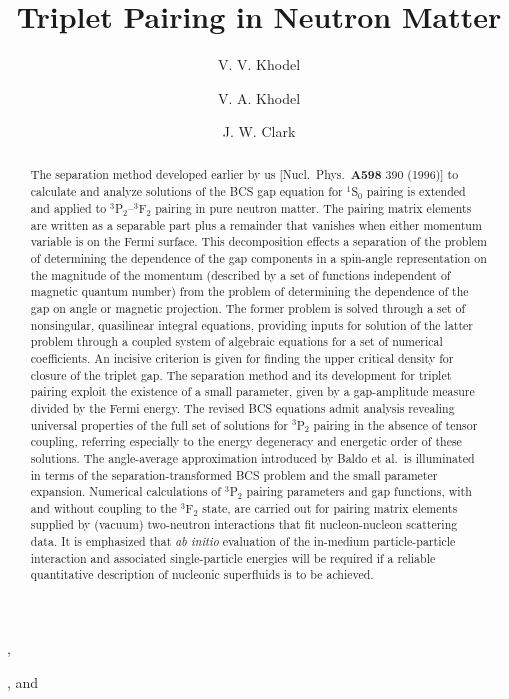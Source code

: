 
\newcommand{\diff}{{\rm d}}

\begin{frontmatter}
\title{Triplet Pairing in Neutron Matter}

\author{V. V. Khodel},
\author{V. A. Khodel}, and
\author{J. W. Clark}
\address{McDonnell Center for the Space Sciences
and Department of Physics, \\
Washington University, St. Louis, MO 63130-4899}

\begin{abstract}
The separation method developed earlier by us [Nucl.\ Phys.\ {\bf A598} 390 
(1996)] to calculate and analyze solutions of the BCS gap equation for 
$^1$S$_0$ pairing is extended and applied to $^3$P$_2$--$^3$F$_2$ pairing in
pure neutron matter.  The pairing matrix elements are written as a separable 
part plus a remainder that vanishes when either momentum variable is on the 
Fermi surface.  This decomposition effects a separation of the problem 
of determining the dependence of the gap components in a spin-angle 
representation on the magnitude of the momentum (described by a set of
functions independent of magnetic quantum number) from the problem of 
determining the dependence of the gap on angle or magnetic projection.  
The former problem is solved through a set of nonsingular, quasilinear 
integral equations, providing inputs for solution of the latter problem 
through a coupled system of algebraic equations for a set of numerical 
coefficients.  An incisive criterion is given for finding the upper 
critical density for closure of the triplet gap.  The separation method 
and its development for triplet pairing exploit the existence of a 
small parameter, given by a gap-amplitude measure divided by the Fermi 
energy.  The revised BCS equations admit analysis revealing universal 
properties of the full set of solutions for $^3$P$_2$ pairing in the 
absence of tensor coupling, referring especially to the energy degeneracy 
and energetic order of these solutions.  The angle-average approximation 
introduced by Baldo et al.\ is illuminated in terms of the 
separation-transformed BCS problem and the small parameter expansion.  
Numerical calculations of $^3$P$_2$ pairing parameters and gap functions, 
with and without coupling to the $^3$F$_2$ state, are carried out for 
pairing matrix elements supplied by (vacuum) two-neutron interactions 
that fit nucleon-nucleon scattering data.  It is emphasized that {\it ab 
initio} evaluation of the in-medium particle-particle interaction and 
associated single-particle energies will be required if a reliable 
quantitative description of nucleonic superfluids is to be achieved.
\end{abstract}
\end{frontmatter}

